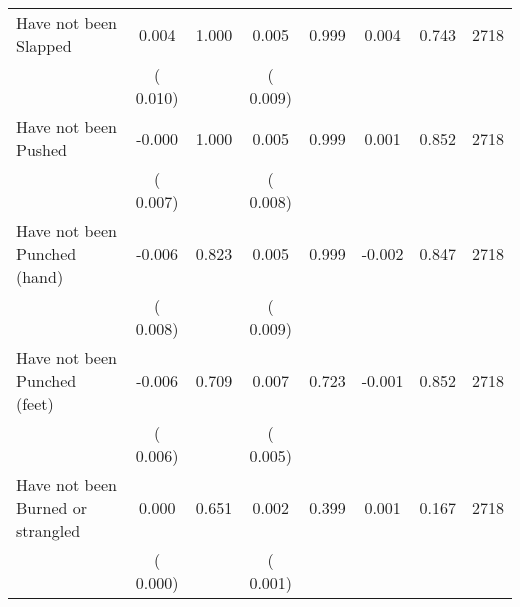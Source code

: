 \begin{tabular}{l*{7}{c}}
 Have not been Slapped       &              0.004       &        1.000  &              0.005       &        0.999  &              0.004       &              0.743 &  2718 \\ 
                       &       (       0.010)             &                               &       (       0.009)                     &                               &                                               &                                &                      \\ 

 Have not been Pushed       &             -0.000       &        1.000  &              0.005       &        0.999  &              0.001       &              0.852 &  2718 \\ 
                       &       (       0.007)             &                               &       (       0.008)                     &                               &                                               &                                &                      \\ 

 Have not been Punched (hand)       &             -0.006       &        0.823  &              0.005       &        0.999  &             -0.002       &              0.847 &  2718 \\ 
                       &       (       0.008)             &                               &       (       0.009)                     &                               &                                               &                                &                      \\ 

 Have not been Punched (feet)       &             -0.006       &        0.709  &              0.007       &        0.723  &             -0.001       &              0.852 &  2718 \\ 
                       &       (       0.006)             &                               &       (       0.005)                     &                               &                                               &                                &                      \\ 

 Have not been Burned or strangled       &              0.000       &        0.651  &              0.002       &        0.399  &              0.001       &              0.167 &  2718 \\ 
                       &       (       0.000)             &                               &       (       0.001)                     &                               &                                               &                                &                      \\ 


\end{tabular}
